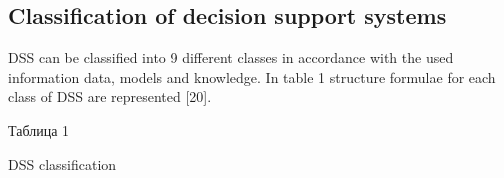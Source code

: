 \documentclass[10pt, a4paper]{article}
\begin{document}
\begin{multicols}{2}
\begin{center}


\section{  Classification of decision support systems}
\end{center}

\begin{flushleft}
DSS can be classified into 9 different classes in
accordance with the used information data, models and
knowledge. In table 1 structure formulae for each class of
DSS are represented [20].
\par
\begin{center}
\caption{ Таблица 1}
\end{center}
\begin{center}
\vspace{-\baselineskip}
  \vspace{0.1cm}
\caption{DSS classification}
\end{center}
\end{flushleft}


\end{multicols}
\end{document}
